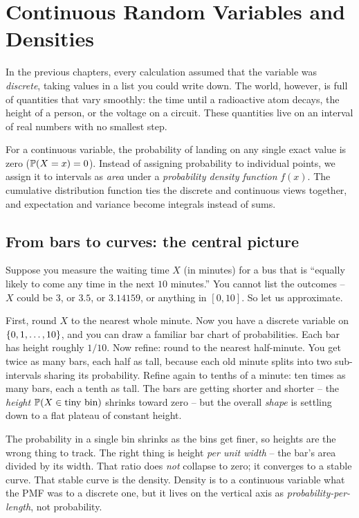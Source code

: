 \chapter{Continuous Random Variables and Densities}

In the previous chapters, every calculation assumed that the
variable was \emph{discrete}, taking values in a list you could write down.
The world, however, is full of quantities that vary smoothly: the time until a
radioactive atom decays, the height of a person, or the voltage on a circuit.
These quantities live on an interval of real numbers with no smallest step.

For a continuous variable, the probability of landing on any single exact value
is zero ($\P(X = x) = 0$). Instead of assigning probability to individual
points, we assign it to intervals as \emph{area} under a \emph{probability
density function} $f(x)$. The cumulative distribution function ties the
discrete and continuous views together, and expectation and variance become
integrals instead of sums.

\section{From bars to curves: the central picture}
\label{ch10:bars-to-curves}

Suppose you measure the waiting time
$X$ (in minutes) for a bus that is ``equally likely to come any time in the next
$10$ minutes.'' You cannot list the outcomes -- $X$ could be $3$, or $3.5$, or
$3.14159$, or anything in $[0,10]$. So let us approximate.

First, round $X$ to the nearest whole minute. Now you have a discrete variable on
$\set{0,1,\dots,10}$, and you can draw a familiar bar chart of probabilities. Each
bar has height roughly $1/10$. Now refine: round to the nearest half-minute. You
get twice as many bars, each half as tall, because each old minute splits into two
sub-intervals sharing its probability. Refine again to tenths of a minute: ten
times as many bars, each a tenth as tall. The bars are getting shorter and shorter
-- the \emph{height} $\P(X \in \text{tiny bin})$ shrinks toward zero -- but the
overall \emph{shape} is settling down to a flat plateau of constant height.

\begin{intuitionbox}
The probability in a single bin shrinks as the bins get finer, so heights are the
wrong thing to track. The right thing is height \emph{per unit width} -- the bar's
area divided by its width. That ratio does \emph{not} collapse to zero; it
converges to a stable curve. That stable curve is the density. Density is to a
continuous variable what the PMF was to a discrete one, but it lives on the
vertical axis as \emph{probability-per-length}, not probability.
\end{intuitionbox}

